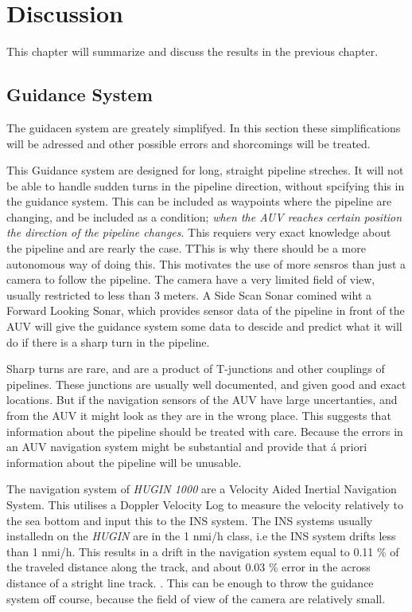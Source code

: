 \chapter{Discussion}
	This chapter will summarize and discuss the results in the previous chapter.

\section{Guidance System}
	The guidacen system are greately simplifyed. In this section these simplifications will be adressed
	and other possible errors and shorcomings will be treated. 

	This Guidance system are designed for long, straight pipeline streches. It will not be able to handle
	sudden turns in the pipeline direction, without spcifying this in the guidance system. This can be
	included as waypoints where the pipeline are changing, and be included as a condition; \textit{when the AUV
	reaches certain position the direction of the pipeline changes}. This requiers very exact knowledge
	about the pipeline and are rearly the case. TThis is why there should be a more autonomous way of
	doing this. This motivates the use of more sensros than just a camera to follow the pipeline. The
	camera have a very limited field of view, usually restricted to less than 3 meters. A Side Scan Sonar
	comined wiht a Forward Looking Sonar, which provides sensor data of the pipeline in front of the AUV
	will give the guidance system some data to descide and predict what it will do if there is a sharp
	turn in the pipeline. 

	Sharp turns are rare, and are a product of T-junctions and other couplings of pipelines. These
	junctions are usually well documented, and given good and exact locations. But if the navigation
	sensors of the AUV have large uncertanties, and from the AUV it might look as they are in the wrong
	place. This suggests that information about the pipeline should be treated with care. Because the
	errors in an AUV navigation system might be substantial and provide that \'a priori information about
	the pipeline will be unusable. 

	The navigation system of \textit{HUGIN 1000} are a Velocity Aided Inertial Navigation System. This
	utilises a Doppler Velocity Log to measure the velocity relatively to the sea bottom and input this to
	the INS system. The INS systems usually installedn on the \textit{HUGIN} are in the 1 nmi/h class, i.e
	the INS system drifts less than 1 nmi/h. This results in a drift in the navigation system equal to
	0.11 \% of the traveled distance along the track, and about 0.03 \% error in the across distance of a
	stright line track. \cite{INS_Hugin}. This can be enough to throw the guidance system off course,
	because the field of view of the camera are relatively small.


